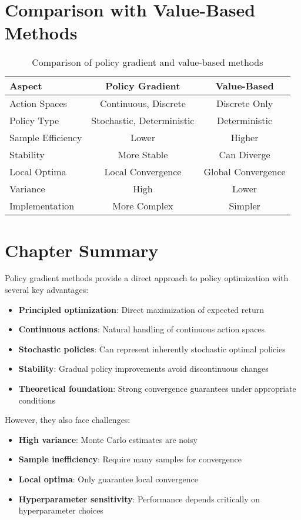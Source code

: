 \section{Comparison with Value-Based Methods}

\begin{table}[h]
\centering
\begin{tabular}{lcc}
\toprule
\textbf{Aspect} & \textbf{Policy Gradient} & \textbf{Value-Based} \\
\midrule
Action Spaces & Continuous, Discrete & Discrete Only \\
Policy Type & Stochastic, Deterministic & Deterministic \\
Sample Efficiency & Lower & Higher \\
Stability & More Stable & Can Diverge \\
Local Optima & Local Convergence & Global Convergence \\
Variance & High & Lower \\
Implementation & More Complex & Simpler \\
\bottomrule
\end{tabular}
\caption{Comparison of policy gradient and value-based methods}
\end{table}

\section{Chapter Summary}

Policy gradient methods provide a direct approach to policy optimization with several key advantages:

\begin{itemize}
    \item \textbf{Principled optimization}: Direct maximization of expected return
    \item \textbf{Continuous actions}: Natural handling of continuous action spaces
    \item \textbf{Stochastic policies}: Can represent inherently stochastic optimal policies
    \item \textbf{Stability}: Gradual policy improvements avoid discontinuous changes
    \item \textbf{Theoretical foundation}: Strong convergence guarantees under appropriate conditions
\end{itemize}

However, they also face challenges:
\begin{itemize}
    \item \textbf{High variance}: Monte Carlo estimates are noisy
    \item \textbf{Sample inefficiency}: Require many samples for convergence
    \item \textbf{Local optima}: Only guarantee local convergence
    \item \textbf{Hyperparameter sensitivity}: Performance depends critically on hyperparameter choices
\end{itemize}

